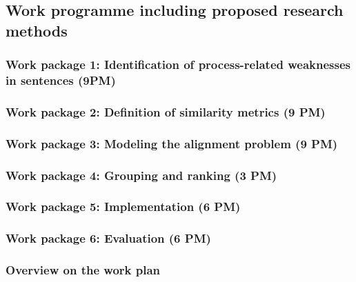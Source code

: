 \documentclass{scrartcl}
\begin{document}
\subsection{Work programme including proposed research methods}


\subsubsection{Work package 1: Identification of process-related weaknesses in sentences (9PM)}
\label{sec:wp1}


\subsubsection{Work package 2: Definition of similarity metrics (9 PM)}
\label{sec:wp2}


\subsubsection{Work package 3: Modeling the alignment problem (9 PM)}
\label{sec:wp3}

\subsubsection{Work package 4: Grouping and ranking (3 PM)}
\label{sec:wp4}

\subsubsection{Work package 5: Implementation (6 PM)}
\label{sec:wp5}


\subsubsection{Work package 6: Evaluation (6 PM)}
\label{sec:wp6}


\subsubsection{Overview on the work plan}
\end{document}
